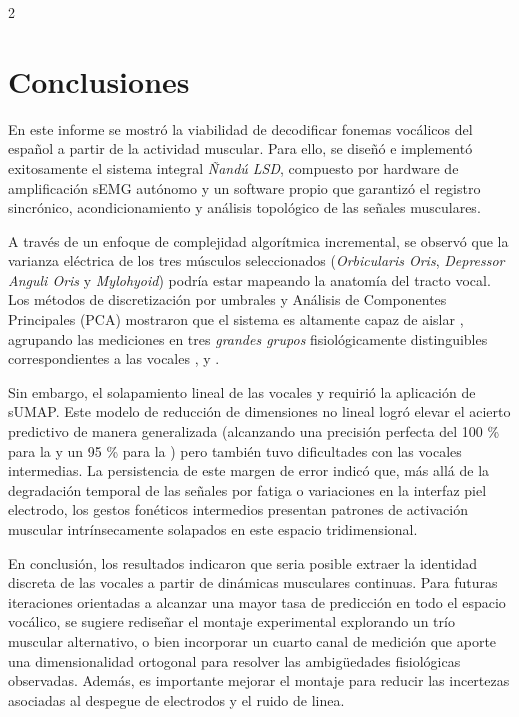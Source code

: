 \documentclass[11pt, letterpaper]{article}
\begin{document}
\begin{multicols*}{2}

\section{Conclusiones}

En este informe se mostró la viabilidad de decodificar fonemas vocálicos del español a partir de la actividad muscular.
Para ello, se diseñó e implementó exitosamente el sistema integral \textit{Ñandú LSD}, compuesto por hardware de amplificación sEMG autónomo y un software propio que garantizó el registro sincrónico, acondicionamiento y análisis topológico de las señales musculares.

A través de un enfoque de complejidad algorítmica incremental, se observó que la varianza eléctrica de los tres músculos seleccionados (\textit{Orbicularis Oris}, \textit{Depressor Anguli Oris} y \textit{Mylohyoid}) podría estar mapeando la anatomía del tracto vocal. Los métodos de discretización por umbrales y Análisis de Componentes Principales (PCA) mostraron que el sistema es altamente capaz de aislar , agrupando las mediciones en tres \textit{grandes grupos} fisiológicamente distinguibles correspondientes a las vocales ,  y .

Sin embargo, el solapamiento lineal de las vocales  y  requirió la aplicación de sUMAP. Este modelo de reducción de dimensiones no lineal logró elevar el acierto predictivo de manera generalizada (alcanzando una precisión perfecta del 100 \% para la  y un 95 \% para la ) pero también tuvo dificultades con las vocales intermedias. La persistencia de este margen de error indicó que, más allá de la degradación temporal de las señales por fatiga o variaciones en la interfaz piel electrodo, los gestos fonéticos intermedios presentan patrones de activación muscular intrínsecamente solapados en este espacio tridimensional.

En conclusión, los resultados indicaron que seria posible extraer la identidad discreta de las vocales a partir de dinámicas musculares continuas. Para futuras iteraciones orientadas a alcanzar una mayor tasa de predicción en todo el espacio vocálico, se sugiere rediseñar el montaje experimental explorando un trío muscular alternativo, o bien incorporar un cuarto canal de medición que aporte una dimensionalidad ortogonal para resolver las ambigüedades fisiológicas observadas. Además, es importante mejorar el montaje para reducir las incertezas asociadas al despegue de electrodos y el ruido de linea.


\end{multicols*}
\end{document}
